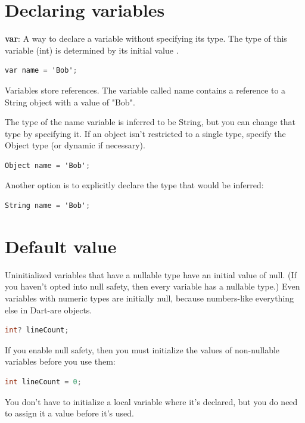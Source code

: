 \section{Declaring variables}
\textbf{var}: A way to declare a variable without specifying its type. The type of this variable (int) is determined by its initial value .
\begin{lstlisting}[language=C]
	var name = 'Bob';
\end{lstlisting}

Variables store references. The variable called name contains a reference to a String object with a value of "Bob".

The type of the name variable is inferred to be String, but you can change that type by specifying it. If an object isn't restricted to a single type, specify the Object type (or dynamic if necessary).
\begin{lstlisting}[language=C]
	Object name = 'Bob';
\end{lstlisting}

Another option is to explicitly declare the type that would be inferred:

\begin{lstlisting}[language=C]
	String name = 'Bob';
\end{lstlisting}

\section{Default value}
Uninitialized variables that have a nullable type have an initial value of null. (If you haven't opted into null safety, then every variable has a nullable type.) Even variables with numeric types are initially null, because numbers-like everything else in Dart-are objects.
\begin{lstlisting}[language=C]
	int? lineCount;
\end{lstlisting}

If you enable null safety, then you must initialize the values of non-nullable variables before you use them:

\begin{lstlisting}[language=C]
	int lineCount = 0;
\end{lstlisting}
You don't have to initialize a local variable where it's declared, but you do need to assign it a value before it's used.
